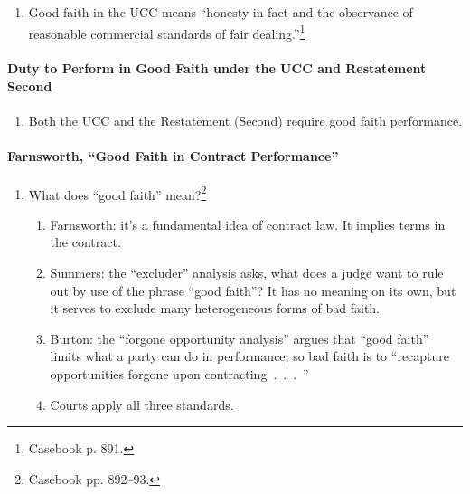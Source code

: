 \begin{enumerate}
    \item Good faith in the UCC means ``honesty in fact and the observance of 
    reasonable commercial standards of fair dealing.''\footnote{Casebook p. 
    891.}
\end{enumerate}

\paragraph{Duty to Perform in Good Faith under the UCC and Restatement 
Second}

\begin{enumerate}
    \item Both the UCC and the Restatement (Second) require good faith 
    performance.
\end{enumerate}

\paragraph{Farnsworth, ``Good Faith in Contract Performance''}

\begin{enumerate}
    \item What does ``good faith'' mean?\footnote{Casebook pp. 892--93.}
    \begin{enumerate}
        \item Farnsworth: it's a fundamental idea of contract law. It implies 
        terms in the contract.
        \item Summers: the ``excluder'' analysis asks, what does a judge want 
        to rule out by use of the phrase ``good faith''? It has no meaning on 
        its own, but it serves to exclude many heterogeneous forms of bad 
        faith.
        \item Burton: the ``forgone opportunity analysis'' argues that ``good 
        faith'' limits what a party can do in performance, so bad faith is to 
        ``recapture opportunities forgone upon 
        contracting~.~.~.~''
        \item Courts apply all three standards.
    \end{enumerate}
\end{enumerate}
